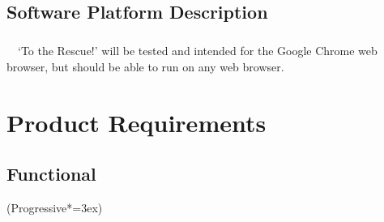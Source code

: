 \documentclass[12pt]{report}
\begin{document}
	\section{Software Platform Description}
		\paragraph{}\ \ ‘To the Rescue!’ will be tested and intended for the Google Chrome web browser, but should be able to run on any web browser.
\chapter{Product Requirements}
\thispagestyle{fancy}
	\section{Functional}
		\ListProperties(Progressive*=3ex)
\end{document}
